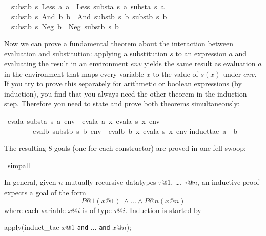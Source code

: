\begin{isabellebody}
\isanewline
\ \ {\isachardoublequote}substb\ s\ {\isacharparenleft}Less\ a\ a\ {\isacharequal}\ Less\ {\isacharparenleft}substa\ s\ a\ {\isacharparenleft}substa\ s\ a\isanewline
\ \ {\isachardoublequote}substb\ s\ {\isacharparenleft}And\ b\ b\ {\isacharequal}\ And\ {\isacharparenleft}substb\ s\ b\ {\isacharparenleft}substb\ s\ b\isanewline
\ \ {\isachardoublequote}substb\ s\ {\isacharparenleft}Neg\ b{\isacharparenright}\ {\isacharequal}\ Neg\ {\isacharparenleft}substb\ s\ b{\isacharparenright}{\isachardoublequote}%
\begin{isamarkuptext}%
Now we can prove a fundamental theorem about the interaction between
evaluation and substitution: applying a substitution $s$ to an expression $a$
and evaluating the result in an environment $env$ yields the same result as
evaluation $a$ in the environment that maps every variable $x$ to the value
of $s(x)$ under $env$. If you try to prove this separately for arithmetic or
boolean expressions (by induction), you find that you always need the other
theorem in the induction step. Therefore you need to state and prove both
theorems simultaneously:%
\end{isamarkuptext}%
\ {\isachardoublequote}evala\ {\isacharparenleft}substa\ s\ a{\isacharparenright}\ env\ {\isacharequal}\ evala\ a\ {\isacharparenleft}{\isasymlambda}x{\isachardot}\ evala\ {\isacharparenleft}s\ x{\isacharparenright}\ env{\isacharparenright}\ {\isasymand}\isanewline
\ \ \ \ \ \ \ \ evalb\ {\isacharparenleft}substb\ s\ b{\isacharparenright}\ env\ {\isacharequal}\ evalb\ b\ {\isacharparenleft}{\isasymlambda}x{\isachardot}\ evala\ {\isacharparenleft}s\ x{\isacharparenright}\ env{\isacharparenright}{\isachardoublequote}\isanewline
{}induct{\isacharunderscore}tac\ a\ \ b{\isacharparenright}%
\begin{isamarkuptxt}%
\noindent
The resulting 8 goals (one for each constructor) are proved in one fell swoop:%
\end{isamarkuptxt}%
\ simp{\isacharunderscore}all%
\begin{isamarkuptext}%
In general, given $n$ mutually recursive datatypes $\tau@1$, \dots, $\tau@n$,
an inductive proof expects a goal of the form
\[ P@1(x@1)\ \land \dots \land P@n(x@n) \]
where each variable $x@i$ is of type $\tau@i$. Induction is started by
\begin{ttbox}
apply(induct_tac \(x@1\) \texttt{and} \(\dots\) \texttt{and} \(x@n\));
\end{ttbox}


\end{isamarkuptext}
\end{isabellebody}

